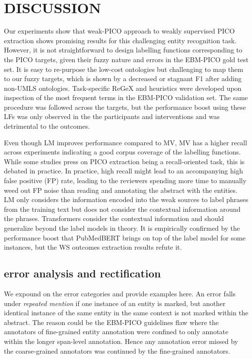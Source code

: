 \documentclass[10.7pt,]{article}
\begin{document}
\section{DISCUSSION}\label{discussion}
%
Our experiments show that weak-PICO approach to weakly supervised PICO extraction shows promising results for this challenging entity recognition task.
However, it is not straightforward to design labelling functions corresponding to the PICO targets, given their fuzzy nature and errors in the EBM-PICO gold test set.
It is easy to re-purpose the low-cost ontologies but challenging to map them to our fuzzy targets, which is shown by a decreased or stagnant F1 after adding non-UMLS ontologies.
Task-specific ReGeX and heuristics were developed upon inspection of the most frequent terms in the EBM-PICO validation set.
The same procedure was followed across the targets, but the performance boost using these LFs was only observed in the the participants and interventions and was detrimental to the outcomes.


Even though LM improves performance compared to MV, MV has a higher recall across experiments indicating a good corpus coverage of the labelling functions.
While some studies press on PICO extraction being a recall-oriented task, this is debated in practice.
In practice, high recall might lead to an accompanying high false positive (FP) rate, leading to the reviewers spending more time to manually weed out FP noise than reading and annotating the abstract with the entities.~\cite{liu2021sent2span}
LM only considers the information encoded into the weak sources to label phrases from the training text but does not consider the contextual information around the phrases.
Transformers consider the contextual information and should generalize beyond the label models in theory.
It is empirically confirmed by the performance boost that PubMedBERT brings on top of the label model for some instances, but the WS outcomes extraction results refute it.
%
%
%
\subsection{error analysis and rectification}\label{err_ana}
%
We expound on the error categories and provide examples here.
An error falls under \textit{repeated mention} if one instance of an entity is marked, but another identical instance of the same entity in the same context is not marked within the abstract. 
The reason could be the EBM-PICO guidelines flaw where the annotators of fine-grained entity annotation were confined to only annotate within the longer span-level annotation.
Hence any annotation error missed by the coarse-grained annotators was continued by the fine-grained annotators.
\end{document}

